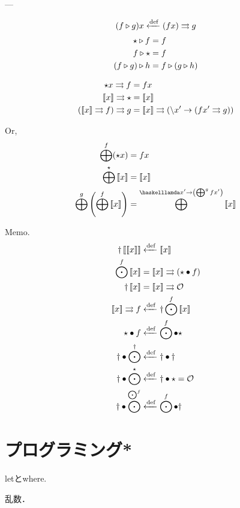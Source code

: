 \documentclass[twocolumn]{jsbook}
\newcommand{\mathidentity}{\mathcal{O}}
\begin{document}
---

$$(f\triangleright g)x\xleftarrow{\text{def}}(fx)\rightrightarrows g$$
\begin{align}
\star\triangleright f&=f\\
f\triangleright\star&=f\\
(f\triangleright g)\triangleright h&=f\triangleright(g\triangleright h)
\end{align}

\begin{align}
\unit x\bind f&=fx\\
\monad{x}\bind\unit&=\monad{x}\\
(\monad{x}\bind f)\bind g&=\monad{x}\bind(\haskelllambda x'\rightarrow(fx'\bind g))
\end{align}

Or,
\begin{align}
\monadfunc^f(\unit x)&=fx\\
\monadfunc^\unit\monad{x}&=\monad{x}\\
\monadfunc^g\left(\monadfunc^f\monad{x}\right)&=\monadfunc^{\haskelllamda x'\rightarrow\left(\monadfunc^gfx'\right)}\monad{x}
\end{align}

Memo.
\begin{align*}
\monadjoin\monad{\monad{x}}&\defeq\monad{x}\\
\mapfunc^f\monad{x}&=\monad{x}\bind(\unit\comp f)\\
\monadjoin\monad{x}&=\monad{x}\bind\mathidentity\\
\monad{x}\bind f&\defeq\monadjoin\mapfunc^f\monad{x}\\
\unit\comp f&\defeq\mapfunc^f\comp\unit\\
\monadjoin\comp\mapfunc^\monadjoin&\defeq\monadjoin\comp\monadjoin\\
\monadjoin\comp\mapfunc^\unit&\defeq\monadjoin\comp\unit=\mathidentity\\
\monadjoin\comp\mapfunc^{\mapfunc^f}&\defeq\mapfunc^f\comp\monadjoin
\end{align*}

\chapter{プログラミング*}

letとwhere.

乱数．
\end{document}

